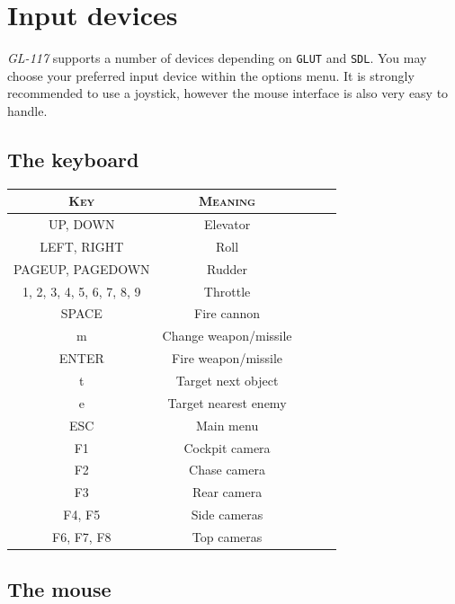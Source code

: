 \section{Input devices}
\label{sec:input_devices}

\emph{GL-117} supports a number of devices depending on \texttt{GLUT} and \texttt{SDL}.
You may choose your preferred input device within the options menu.
It is strongly recommended to use a joystick, however the mouse interface
is also very easy to handle.

\subsection{The keyboard}
\label{subsec:keyboard}

\begin{center}
\begin{tabular}{|c|c|l|l|l|}
\hline
\textsc{Key} & \textsc{Meaning}\\\hline
UP, DOWN & Elevator\\
LEFT, RIGHT & Roll\\
PAGEUP, PAGEDOWN & Rudder\\
1, 2, 3, 4, 5, 6, 7, 8, 9 & Throttle\\
\hline
SPACE & Fire cannon\\
m & Change weapon/missile\\
ENTER & Fire weapon/missile\\
\hline
t & Target next object\\
e & Target nearest enemy\\
\hline
ESC & Main menu\\
\hline
F1 & Cockpit camera\\
F2 & Chase camera\\
F3 & Rear camera\\
F4, F5 & Side cameras\\
F6, F7, F8 & Top cameras\\
\hline
\end{tabular}
\end{center}

\subsection{The mouse}
\label{subsec:mouse}


